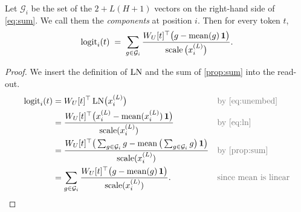 \begin{proposition}\label{prop:dla}
Let $\mathcal G_i$ be the set of the $2+L(H+1)$ vectors on the right-hand side of \eqref{eq:sum}. We call them
the \emph{components} at position $i$. Then for every token $t$,
\begin{equation}\label{eq:dla}
\mathrm{logit}_i(t) \;=\; \sum_{g\in\mathcal G_i}\frac{W_U[t]^\top\big(g-\operatorname{mean}(g)\,\mathbf{1}\big)}{\operatorname{scale}\big(x_i^{(L)}\big)} .
\end{equation}
\end{proposition}
\begin{proof}
We insert the definition of $\mathrm{LN}$ and the sum of \cref{prop:sum} into the read-out.
\begin{align*}
\logit_i(t) &= W_U[t]^\top\,\LN\big(x_i^{(L)}\big) && \by{by \eqref{eq:unembed}}\\
&= \frac{W_U[t]^\top\big(x_i^{(L)}-\mean(x_i^{(L)})\,\one\big)}{\scale(x_i^{(L)})} && \by{by \eqref{eq:ln}}\\
&= \frac{W_U[t]^\top\big(\sum_{g\in\mathcal G_i}g-\mean\big(\sum_{g\in\mathcal G_i}g\big)\,\one\big)}{\scale(x_i^{(L)})} && \by{by \cref{prop:sum}}\\
&= \sum_{g\in\mathcal G_i}\frac{W_U[t]^\top\big(g-\mean(g)\,\one\big)}{\scale(x_i^{(L)})}. && \by{since $\mean$ is linear}\qedhere
\end{align*}
\end{proof}

